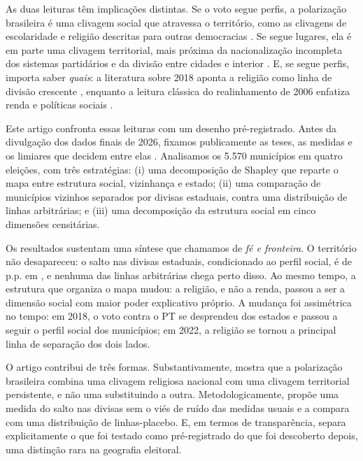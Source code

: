 \documentclass[11pt,a4paper]{article}
\begin{document}
As duas leituras têm implicações distintas. Se o voto segue perfis, a polarização brasileira é uma
clivagem social que atravessa o território, como as clivagens de escolaridade e religião descritas
para outras democracias \citep{gethin2021}. Se segue lugares, ela é em parte uma clivagem
territorial, mais próxima da nacionalização incompleta dos sistemas partidários
\citep{jones2003} e da divisão entre cidades e interior \citep{rodden2019}. E, se segue perfis,
importa saber \emph{quais}: a literatura sobre 2018 aponta a religião como linha de divisão
crescente \citep{smith2019,layton2021}, enquanto a leitura clássica do realinhamento de 2006 enfatiza
renda e políticas sociais \citep{zucco2008,hunter2007}.

Este artigo confronta essas leituras com um desenho pré-registrado. Antes da divulgação dos dados
finais de 2026, fixamos publicamente as teses, as medidas e os limiares que decidem entre elas
\citep{nosek2018}. Analisamos os 5.570 municípios em quatro eleições, com três estratégias: (i) uma
decomposição de Shapley que reparte o mapa entre estrutura social, vizinhança e estado; (ii) uma
comparação de municípios vizinhos separados por divisas estaduais, contra uma distribuição de linhas
arbitrárias; e (iii) uma decomposição da estrutura social em cinco dimensões censitárias.

Os resultados sustentam uma síntese que chamamos de \emph{fé e fronteira}. O território não
desapareceu: o salto nas divisas estaduais, condicionado ao perfil social, é de  p.p.
em \anoFim{}, e nenhuma das  linhas arbitrárias chega perto disso. Ao mesmo tempo, a
estrutura que organiza o mapa mudou: a religião, e não a renda, passou a ser a dimensão social com
maior poder explicativo próprio. A mudança foi assimétrica no tempo: em 2018, o voto contra o PT se
desprendeu dos estados e passou a seguir o perfil social dos municípios; em 2022, a religião se
tornou a principal linha de separação dos dois lados.

O artigo contribui de três formas. Substantivamente, mostra que a polarização brasileira combina uma
clivagem religiosa nacional com uma clivagem territorial persistente, e não uma substituindo a outra.
Metodologicamente, propõe uma medida do salto nas divisas sem o viés de ruído das medidas usuais e a
compara com uma distribuição de linhas-placebo. E, em termos de transparência, separa explicitamente
o que foi testado como pré-registrado do que foi descoberto depois, uma distinção rara na geografia
eleitoral.
\end{document}
